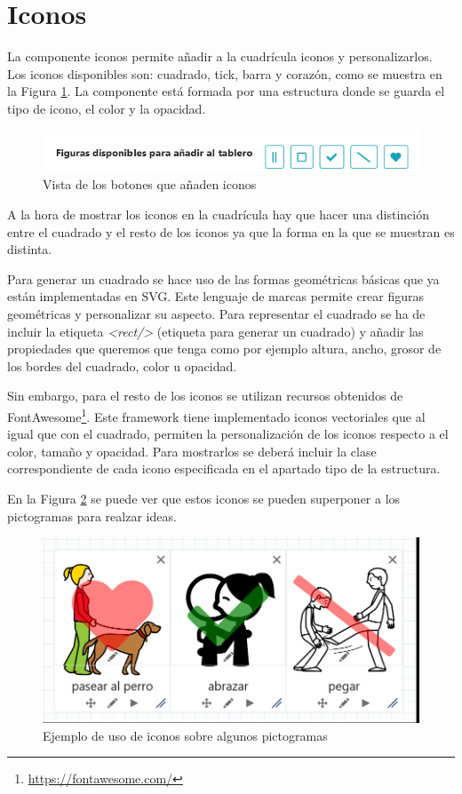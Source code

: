 \section{Iconos}

La componente iconos permite añadir a la cuadrícula iconos y personalizarlos. Los iconos disponibles son: cuadrado, tick, barra y corazón, como se muestra en la Figura \ref{fig:herramientaitems}. La componente está formada por una estructura donde se guarda el tipo de icono, el color y la opacidad.

\begin{figure}[h!]
	\centering
	\includegraphics[width=0.7\linewidth]{Imagenes/Bitmap/herramientaItems}
	\caption{Vista de los botones que añaden iconos}
	\label{fig:herramientaitems}
\end{figure}


A la hora de mostrar los iconos en la cuadrícula hay que hacer una distinción entre el cuadrado y el resto de los iconos ya que la forma en la que se muestran es distinta.

Para generar un cuadrado se hace uso de las formas geométricas básicas que ya están implementadas en SVG. Este lenguaje de marcas permite crear figuras geométricas y personalizar su aspecto. Para representar el cuadrado se ha de incluir la etiqueta \textit{<rect/>} (etiqueta para generar un cuadrado) y añadir las propiedades que queremos que tenga como por ejemplo altura, ancho, grosor de los bordes del cuadrado, color u opacidad.

Sin embargo, para el resto de los iconos se utilizan recursos obtenidos de FontAwesome\footnote{\url{https://fontawesome.com/}}. Este framework tiene implementado iconos vectoriales que al igual que con el cuadrado, permiten la personalización de los iconos respecto a el color, tamaño y opacidad. Para mostrarlos se deberá incluir la clase correspondiente de cada icono especificada en el apartado tipo de la estructura.

En la Figura \ref{fig:ejemplopictoitem} se puede ver que estos iconos se pueden superponer a los pictogramas para realzar ideas.

\begin{figure}[h!]
	\centering
	\includegraphics[width=0.7\linewidth]{Imagenes/Bitmap/ejemploPictoItem}
	\caption{Ejemplo de uso de iconos sobre algunos pictogramas}
	\label{fig:ejemplopictoitem}
\end{figure}


